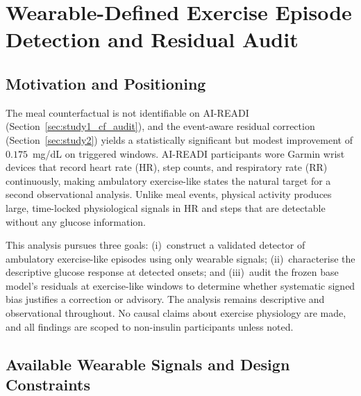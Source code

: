 \section{Wearable-Defined Exercise Episode Detection and Residual Audit}
\label{sec:exercise_detection}

\subsection{Motivation and Positioning}
\label{subsec:ex_motivation}

The meal counterfactual is not identifiable on AI-READI
(Section~\ref{sec:study1_cf_audit}), and the event-aware residual correction
(Section~\ref{sec:study2}) yields a statistically significant but modest
improvement of $0.175$~mg/dL on triggered windows.
AI-READI participants wore Garmin wrist devices that record heart rate (HR),
step counts, and respiratory rate (RR) continuously, making ambulatory
exercise-like states the natural target for a second observational analysis.
Unlike meal events, physical activity produces large, time-locked physiological
signals in HR and steps that are detectable without any glucose information.

This analysis pursues three goals: (i)~construct a validated detector of
ambulatory exercise-like episodes using only wearable signals; (ii)~characterise
the descriptive glucose response at detected onsets; and (iii)~audit the frozen
base model's residuals at exercise-like windows to determine whether systematic
signed bias justifies a correction or advisory.
The analysis remains descriptive and observational throughout.
No causal claims about exercise physiology are made, and all findings are
scoped to non-insulin participants unless noted.

\subsection{Available Wearable Signals and Design Constraints}
\label{subsec:ex_signals}

